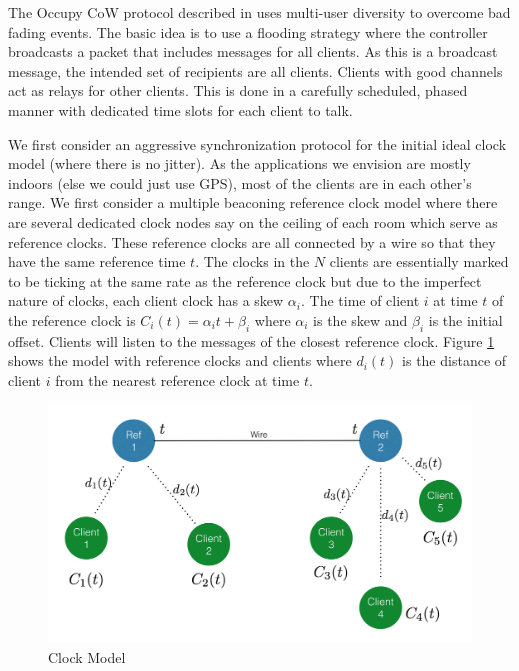 \documentclass[10pt, journal, letter, onecolumn]{IEEEtran}
\begin{document}
The Occupy CoW protocol described in \cite{swamy2015cooperative} uses multi-user diversity to overcome bad fading events. The basic idea is to use a flooding strategy where the controller broadcasts a packet that includes messages for all clients. As this is a broadcast message, the intended set of recipients are all clients. Clients with good channels act as relays for other clients. This is done in a carefully scheduled, phased manner with dedicated time slots for each client to talk.

We first consider an aggressive synchronization protocol for the initial ideal clock model (where there is no jitter). As the applications we envision are mostly indoors (else we could just use GPS), most of the clients are in each other's range. We first consider a multiple beaconing reference clock model where there are several dedicated clock nodes say on the ceiling of each room which serve as reference clocks. These reference clocks are all connected by a wire so that they have the same reference time $t$.
The clocks in the $N$ clients are essentially marked to be ticking at the same rate as the reference clock but due to the imperfect nature of clocks, each client clock has a skew $\alpha_i$.
The time of client $i$ at time $t$ of the reference clock is $C_i(t) = \alpha_ i t + \beta_i$ where $\alpha_i$ is the skew and $\beta_i$ is the initial offset. Clients will listen to the messages of the closest reference clock. Figure \ref{fig:clock_model} shows the model with reference clocks and clients where $d_i(t)$ is the distance of client $i$ from the nearest reference clock at time $t$.

\begin{figure}[h]
    \centering
    \includegraphics[scale=0.4]{figures/figure1}
    \caption{Clock Model}
    \label{fig:clock_model}
\end{figure}
\end{document}
